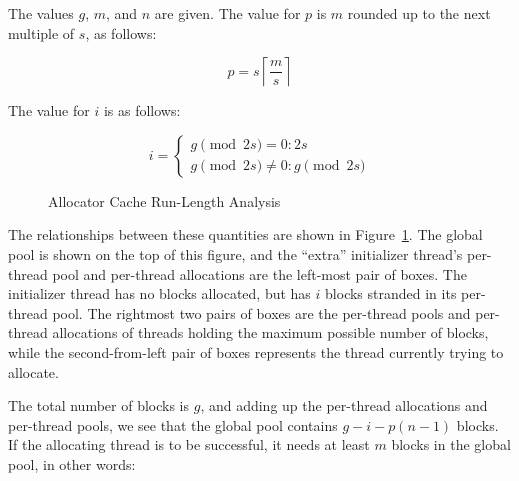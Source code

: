{{	The values $g$, $m$, and $n$ are given.  The value for $p$ is
	$m$ rounded up to the next multiple of $s$, as follows:

	\begin{equation}
		p = s \left \lceil \frac{m}{s} \right \rceil
	\label{sec:SMPdesign:p}
	\end{equation}

	The value for $i$ is as follows:

	\begin{equation}
		i = \left \{
			\begin{array}{l}
				g \pmod{2 s} = 0: 2 s \\
				g \pmod{2 s} \ne 0: g \pmod{2 s}
			\end{array}
		    \right .
	\label{sec:SMPdesign:i}
	\end{equation}

	\begin{figure}[tb]
	\centering
	\caption{Allocator Cache Run-Length Analysis}
	\label{fig:SMPdesign:Allocator Cache Run-Length Analysis}
	\end{figure}

	The relationships between these quantities are shown in
	Figure~\ref{fig:SMPdesign:Allocator Cache Run-Length Analysis}.
	The global pool is shown on the top of this figure, and
	the ``extra'' initializer thread's per-thread pool and
	per-thread allocations are the left-most pair of boxes.
	The initializer thread has no blocks allocated, but has
	$i$ blocks stranded in its per-thread pool.
	The rightmost two pairs of boxes are the per-thread pools and
	per-thread allocations of threads holding the maximum possible
	number of blocks, while the second-from-left pair of boxes
	represents the thread currently trying to allocate.

	The total number of blocks is $g$, and adding up the per-thread
	allocations and per-thread pools, we see that the global pool
	contains $g-i-p(n-1)$ blocks.
	If the allocating thread is to be successful, it needs at least
	$m$ blocks in the global pool, in other words:

}}
